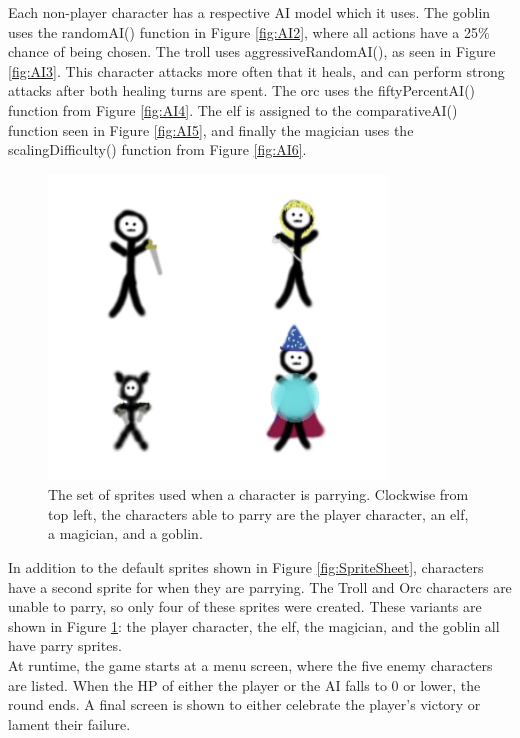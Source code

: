 Each non-player character has a respective AI model which it uses. The goblin uses the randomAI() function in Figure \ref{fig:AI2}, where all actions have a 25\% chance of being chosen. The troll uses aggressiveRandomAI(), as seen in Figure \ref{fig:AI3}. This character attacks more often that it heals, and can perform strong attacks after both healing turns are spent. The orc uses the fiftyPercentAI() function from Figure \ref{fig:AI4}. The elf is assigned to the comparativeAI() function seen in Figure \ref{fig:AI5}, and finally the magician uses the scalingDifficulty() function from Figure \ref{fig:AI6}.

\begin{figure}[H]
  \centering
  \includegraphics[width=9cm]{sprites/ParrySheet.png}
  \caption{The set of sprites used when a character is parrying. Clockwise from top left, the characters able to parry are the player character, an elf, a magician, and a goblin.}
  \label{fig:ParrySheet}
\end{figure}

In addition to the default sprites shown in Figure \ref{fig:SpriteSheet}, characters have a second sprite for when they are parrying. The Troll and Orc characters are unable to parry, so only four of these sprites were created. These variants are shown in Figure \ref{fig:ParrySheet}: the player character, the elf, the magician, and the goblin all have parry sprites.\\

At runtime, the game starts at a menu screen, where the five enemy characters are listed. When the HP of either the player or the AI falls to 0 or lower, the round ends. A final screen is shown to either celebrate the player's victory or lament their failure.

